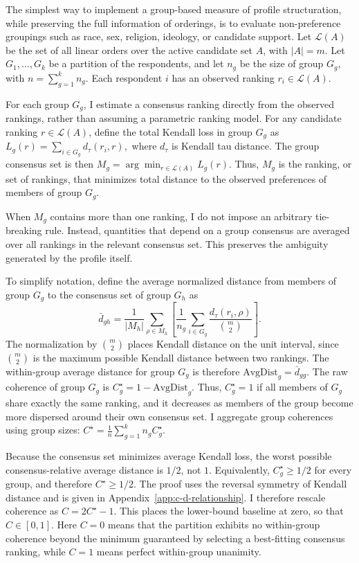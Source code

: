 \documentclass[12pt]{article}
\begin{document}
The simplest way to implement a group-based measure of profile
structuration, while preserving the full information of orderings, is to
evaluate non-preference groupings such as race, sex, religion, ideology, or
candidate support. Let \(\mathcal{L}(A)\) be the set of all linear orders
over the active candidate set \(A\), with \(|A|=m\). Let
\(G_1,\ldots,G_k\) be a partition of the respondents, and let \(n_g\) be
the size of group \(G_g\), with \(n=\sum_{g=1}^k n_g\). Each respondent
\(i\) has an observed ranking \(r_i\in\mathcal{L}(A)\).

For each group \(G_g\), I estimate a consensus ranking directly from the
observed rankings, rather than assuming a parametric ranking model. For
any candidate ranking \(r\in\mathcal{L}(A)\), define the total Kendall
loss in group \(G_g\) as
\(L_g(r) =\sum_{i\in G_g} d_{\tau}(r_i,r), \)
where \(d_{\tau}\) is Kendall tau distance. The group consensus set is
then \(M_g = \arg\min_{r\in\mathcal{L}(A)} L_g(r). \) Thus, \(M_g\) is the ranking, or set of rankings, that minimizes total
distance to the observed preferences of members of group \(G_g\).

When \(M_g\) contains more than one ranking, I do not impose an arbitrary
tie-breaking rule. Instead, quantities that depend on a group consensus
are averaged over all rankings in the relevant consensus set. This
preserves the ambiguity generated by the profile itself.

To simplify notation, define the average normalized distance from members
of group \(G_g\) to the consensus set of group \(G_h\) as
\[
\bar d_{gh}
=
\frac{1}{|M_h|}
\sum_{\rho\in M_h}
\left[
\frac{1}{n_g}
\sum_{i\in G_g}
\frac{d_{\tau}(r_i,\rho)}{\binom{m}{2}}
\right].
\]
The normalization by \(\binom{m}{2}\) places Kendall distance on the unit
interval, since \(\binom{m}{2}\) is the maximum possible Kendall distance
between two rankings. The within-group average distance for group \(G_g\) is therefore
\(\text{AvgDist}_g = \bar d_{gg}.\) The raw coherence of group \(G_g\) is
\( C_g^{\star} = 1-\text{AvgDist}_g.\) Thus, \(C_g^{\star}=1\) if all members of
\(G_g\) share exactly the same ranking, and it decreases as members of the group
become more dispersed around their own consensus set. I aggregate group
coherences using group sizes:
\(C^{\star} = \frac{1}{n} \sum_{g=1}^{k} n_g C_g^{\star}.\)

Because the consensus set minimizes average Kendall loss, the worst possible
consensus-relative average distance is \(1/2\), not \(1\). Equivalently,
\(C_g^{\star}\geq 1/2\) for every group, and therefore \(C^{\star}\geq 1/2\).
The proof uses the reversal symmetry of Kendall distance and is given in
Appendix~\ref{app:c-d-relationship}. I therefore rescale coherence as
\(C = 2C^{\star}-1. \) This places the lower-bound baseline at zero, so that \(C\in[0,1]\).
Here \(C=0\) means that the partition exhibits no within-group coherence
beyond the minimum guaranteed by selecting a best-fitting consensus
ranking, while \(C=1\) means perfect within-group unanimity.
\end{document}
